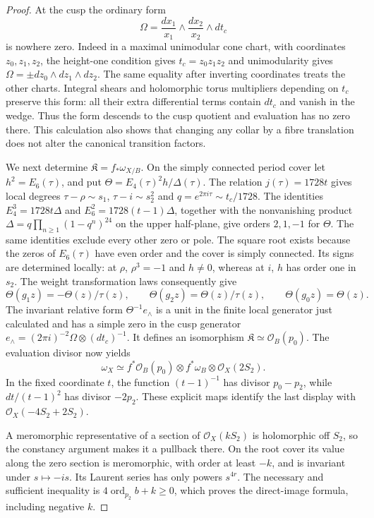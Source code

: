 \begin{proof}
At the cusp the ordinary form
\[
 \Omega=\frac{dx_1}{x_1}\wedge\frac{dx_2}{x_2}\wedge dt_c
\]
is nowhere zero. Indeed in a maximal unimodular cone chart, with coordinates $z_0,z_1,z_2$, the height-one condition gives $t_c=z_0z_1z_2$ and unimodularity gives $\Omega=\pm dz_0\wedge dz_1\wedge dz_2$. The same equality after inverting coordinates treats the other charts. Integral shears and holomorphic torus multipliers depending on $t_c$ preserve this form: all their extra differential terms contain $dt_c$ and vanish in the wedge. Thus the form descends to the cusp quotient and evaluation has no zero there. This calculation also shows that changing any collar by a fibre translation does not alter the canonical transition factors.

We next determine $\mathfrak K=f_*\omega_{X/B}$. On the simply connected period cover let $h^2=E_6(\tau)$, and put $\Theta=E_4(\tau)^2h/\Delta(\tau)$. The relation $j(\tau)=1728t$ gives local degrees $\tau-\rho\sim s_1$, $\tau-i\sim s_2^2$ and $q=e^{2\pi i\tau}\sim t_c/1728$. The identities $E_4^3=1728t\Delta$ and $E_6^2=1728(t-1)\Delta$, together with the nonvanishing product $\Delta=q\prod_{n\ge1}(1-q^n)^{24}$ on the upper half-plane, give orders $2,1,-1$ for $\Theta$. The same identities exclude every other zero or pole. The square root exists because the zeros of $E_6(\tau)$ have even order and the cover is simply connected. Its signs are determined locally: at $\rho$, $\rho^3=-1$ and $h\ne0$, whereas at $i$, $h$ has order one in $s_2$. The weight transformation laws consequently give
\[
 \Theta(g_1z)=-\Theta(z)/\tau(z),\qquad
 \Theta(g_2z)=\Theta(z)/\tau(z),\qquad \Theta(g_0z)=\Theta(z).
\]
The invariant relative form $\Theta^{-1}e_\wedge$ is a unit in the finite local generator just calculated and has a simple zero in the cusp generator $e_\wedge=(2\pi i)^{-2}\Omega\otimes(dt_c)^{-1}$. It defines an isomorphism $\mathfrak K\simeq\mathcal O_B(p_0)$. The evaluation divisor now yields
\[
 \omega_X\simeq f^*\mathcal O_B(p_0)\otimes f^*\omega_B\otimes\mathcal O_X(2S_2).
\]
In the fixed coordinate $t$, the function $(t-1)^{-1}$ has divisor $p_0-p_2$, while $dt/(t-1)^2$ has divisor $-2p_2$. These explicit maps identify the last display with $\mathcal O_X(-4S_2+2S_2)$.

A meromorphic representative of a section of $\mathcal O_X(kS_2)$ is holomorphic off $S_2$, so the constancy argument makes it a pullback there. On the root cover its value along the zero section is meromorphic, with order at least $-k$, and is invariant under $s\mapsto-is$. Its Laurent series has only powers $s^{4r}$. The necessary and sufficient inequality is $4\operatorname{ord}_{p_2}b+k\ge0$, which proves the direct-image formula, including negative $k$.


\end{proof}

